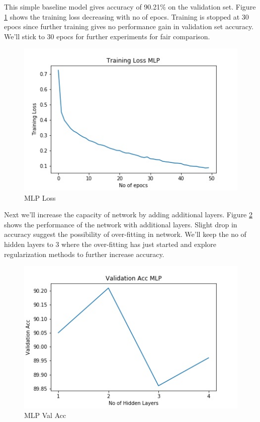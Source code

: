 \documentclass[10pt,a4paper]{article}
\begin{document}
	This simple baseline model gives accuracy of 90.21\% on the validation set. Figure \ref{mlploss} shows the training loss decreasing with no of epocs. Training is stopped at 30 epocs since further training gives no performance gain in validation set accuracy. We'll stick to 30 epocs for further experiments for fair comparison. \\

\begin{figure}[h!]
\begin{center}
	\includegraphics[width=0.85\linewidth]{training_mlp.jpg}
	\caption{MLP Loss}
	\label{mlploss}
\end{center}
\end{figure}

\pagebreak

	Next we'll increase the capacity of network by adding additional layers. Figure \ref{mlpval} shows the performance of the network with additional layers. Slight drop in accuracy suggest the possibility of over-fitting in network. We'll keep the no of hidden layers to 3 where the over-fitting has just started and explore regularization methods to further increase accuracy.

\begin{figure}[h!]
\begin{center}
	\includegraphics[width=0.85\linewidth]{val_mlp.jpg}
	\caption{MLP Val Acc}
	\label{mlpval}
\end{center}
\end{figure}
	
\end{document}
